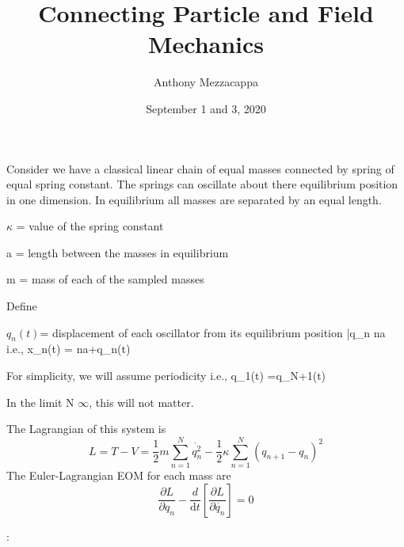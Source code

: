 \documentclass{article}
\title{Connecting Particle and Field Mechanics}
\author{Anthony Mezzacappa}
\date{September 1 and 3, 2020}
\begin{document}
\setlength{\parskip}{1em}
\maketitle
\noindent
Consider we have a classical linear chain of equal masses connected by spring of equal spring constant. The springs can oscillate about there equilibrium position in one dimension. In equilibrium all masses are separated by an equal length. \par

$\kappa$ = value of the spring constant \par
a = length between the masses in equilibrium\par
m = mass of each of the sampled masses\par


\noindent Define \par
\noindent $q_n(t) $= displacement of each oscillator from its equilibrium position \bar q_n \equiv na  i.e., x_n(t) = na+q_n(t) \par
\noindent For simplicity, we will assume periodicity i.e., q_1(t) =q_{N+1}(t) \par
\noindent In the limit N \rightarrow $\infty$, this will not matter. \par
\noindent The Lagrangian of this system is
\begin{equation}
    L = T - V  = \frac{1}{2} m \sum_{n=1}^N \dot{q_n^2} - \frac{1}{2} \kappa \sum_{n=1}^N (q_{n+1} - q_n)^2
\end{equation}
\noindent The Euler-Lagrangian EOM for each mass are
\begin{equation}
    \dfrac{ \partial L }{ \partial q_n} -  \dfrac{d}{ \mathrm{d} t} \left[\dfrac{ \partial L }{ \partial \dot {q_n}} \right] = 0
\end{equation}

 :
\end{document}
